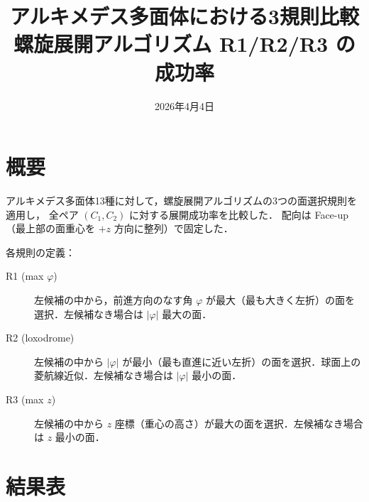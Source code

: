 \documentclass[a4paper,11pt]{article}
\title{アルキメデス多面体における3規則比較\\
       \large 螺旋展開アルゴリズム R1/R2/R3 の成功率}
\author{}
\date{2026年4月4日}
\begin{document}
\maketitle

\section{概要}

アルキメデス多面体13種に対して，螺旋展開アルゴリズムの3つの面選択規則を適用し，
全ペア $(C_1, C_2)$ に対する展開成功率を比較した．
配向は Face-up（最上部の面重心を $+z$ 方向に整列）で固定した．

\bigskip
\noindent
各規則の定義：
\begin{description}
  \item[R1 (max $\varphi$)] 左候補の中から，前進方向のなす角 $\varphi$ が最大（最も大きく左折）の面を選択．左候補なき場合は $|\varphi|$ 最大の面．
  \item[R2 (loxodrome)] 左候補の中から $|\varphi|$ が最小（最も直進に近い左折）の面を選択．球面上の菱航線近似．左候補なき場合は $|\varphi|$ 最小の面．
  \item[R3 (max $z$)] 左候補の中から $z$ 座標（重心の高さ）が最大の面を選択．左候補なき場合は $z$ 最小の面．
\end{description}

\section{結果表}
\end{document}

